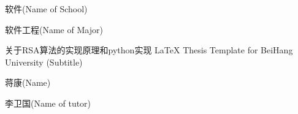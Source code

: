 
\school
{软件}{(Name of School)}

\major
{软件工程}{(Name of Major)}

\thesistitle
{关于RSA算法的实现原理和python实现}
{}
{\LaTeX{} Thesis Template for BeiHang University}
{(Subtitle)}

\thesisauthor
{蒋康}{(Name)}

\teacher
{李卫国}{(Name of tutor)}






